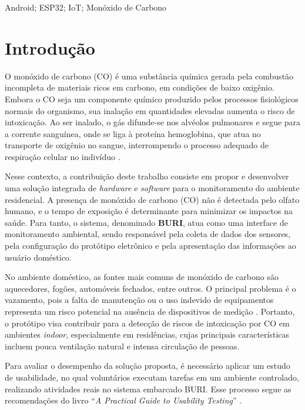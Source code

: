 \documentclass[alpha-refs,brazilian]{RBCA_v3.0}
\begin{document}
\begin{frontmatter}
\begin{palavras_chave} %
	Android; ESP32; IoT; Monóxido de Carbono
\end{palavras_chave}

\end{frontmatter}

\section{Introdução}

O monóxido de carbono (CO) é uma substância química gerada pela combustão incompleta de materiais ricos em carbono, em condições de baixo oxigênio. 
Embora o CO seja um componente químico produzido pelos processos fisiológicos normais do organismo, sua inalação em quantidades elevadas aumenta o 
risco de intoxicação. Ao ser inalado, o gás difunde-se nos alvéolos pulmonares e segue para a corrente sanguínea, onde se liga à proteína hemoglobina, 
que atua no transporte de oxigênio no sangue, interrompendo o processo adequado de respiração celular no indivíduo \citep{gases-sufocantes-hernandez-2022}.

Nesse contexto, a contribuição deste trabalho consiste em propor e desenvolver uma solução integrada de \textit{hardware} e \textit{software} para o monitoramento 
do ambiente residencial. A presença de monóxido de carbono (CO) não é detectada pelo olfato humano, e o tempo de exposição é determinante para minimizar os impactos 
na saúde. Para tanto, o sistema, denominado \textbf{BURI}, atua como uma interface de monitoramento ambiental, sendo responsável pela coleta de dados dos sensores, 
pela configuração do protótipo eletrônico e pela apresentação das informações ao usuário doméstico.

No ambiente doméstico, as fontes mais comuns de monóxido de carbono são aquecedores, fogões, automóveis fechados, entre outros. O principal problema é o vazamento, pois 
a falta de manutenção ou o uso indevido de equipamentos representa um risco potencial na ausência de dispositivos de medição \citep{varon-poisoning}. Portanto, o protótipo 
visa contribuir para a detecção de riscos de intoxicação por CO em ambientes \textit{indoor}, especialmente em residências, cujas principais características incluem pouca 
ventilação natural e intensa circulação de pessoas.

Para avaliar o desempenho da solução proposta, é necessário aplicar um estudo de usabilidade, no qual voluntários executam tarefas em um ambiente controlado, realizando atividades 
reais no sistema embarcado BURI. Esse processo segue as recomendações do livro ``\textit{A Practical Guide to Usability Testing}'' \citep{guide-usability-design}.
\end{document}
